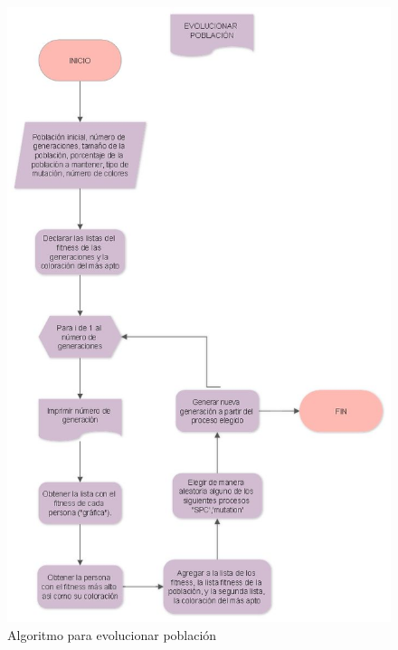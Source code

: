 \documentclass{article}
\begin{document}
\begin{figure}[H]
    \centering
    \includegraphics[width=12cm]{flujo_evol.jpg}
    \caption{Algoritmo para evolucionar población}
    \label{fig:my_label}
\end{figure}
\newpage
\end{document}
